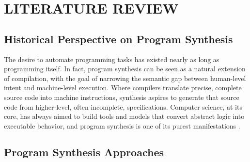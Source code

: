 %
%
%



\chapter{\MakeUppercase{Literature Review}}

%

\section{Historical Perspective on Program Synthesis}

\indent\indent The desire to automate programming tasks has existed nearly as long as programming itself. In fact, program synthesis can be seen as a natural extension of compilation, with the goal of narrowing the semantic gap between human-level intent and machine-level execution. Where compilers translate precise, complete source code into machine instructions, synthesis aspires to generate that source code from higher-level, often incomplete, specifications. Computer science, at its core, has always aimed to build tools and models that convert abstract logic into executable behavior, and program synthesis is one of its purest manifestations \cite{solarlezama_2023_introduction}.

\section{Program Synthesis Approaches}

